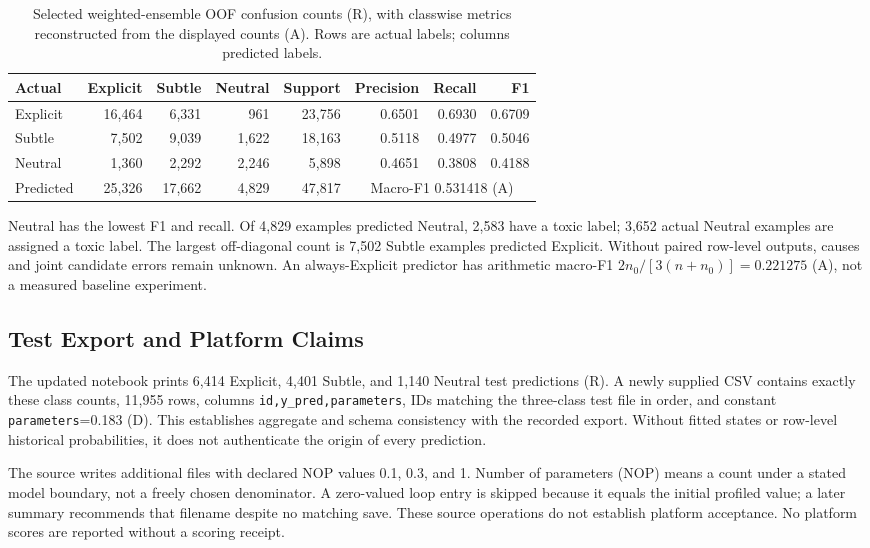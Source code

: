 \documentclass[doublecolumn]{ijcvsplatex}
\begin{document}
\begin{table}[t]
\small\centering
\caption{Selected weighted-ensemble OOF confusion counts (R), with classwise metrics reconstructed from the displayed counts (A). Rows are actual labels; columns predicted labels.}
\label{tab:confusion}
\begin{tabular}{lrrrrrrr}
\toprule
Actual & Explicit & Subtle & Neutral & Support & Precision & Recall & F1 \\
\midrule
Explicit & 16,464 & 6,331 & 961 & 23,756 & 0.6501 & 0.6930 & 0.6709 \\
Subtle & 7,502 & 9,039 & 1,622 & 18,163 & 0.5118 & 0.4977 & 0.5046 \\
Neutral & 1,360 & 2,292 & 2,246 & 5,898 & 0.4651 & 0.3808 & 0.4188 \\
\midrule
Predicted & 25,326 & 17,662 & 4,829 & 47,817 & \multicolumn{3}{c}{Macro-F1 0.531418 (A)} \\
\bottomrule
\end{tabular}
\end{table}

Neutral has the lowest F1 and recall. Of 4,829 examples predicted Neutral, 2,583 have a toxic label; 3,652 actual Neutral examples are assigned a toxic label. The largest off-diagonal count is 7,502 Subtle examples predicted Explicit. Without paired row-level outputs, causes and joint candidate errors remain unknown. An always-Explicit predictor has arithmetic macro-F1 $2n_0/[3(n+n_0)]=0.221275$ (A), not a measured baseline experiment.

\subsection{Test Export and Platform Claims}
The updated notebook prints 6,414 Explicit, 4,401 Subtle, and 1,140 Neutral test predictions (R). A newly supplied CSV contains exactly these class counts, 11,955 rows, columns \texttt{id,y\_pred,parameters}, IDs matching the three-class test file in order, and constant \texttt{parameters}=0.183 (D). This establishes aggregate and schema consistency with the recorded export. Without fitted states or row-level historical probabilities, it does not authenticate the origin of every prediction.

The source writes additional files with declared NOP values 0.1, 0.3, and 1. Number of parameters (NOP) means a count under a stated model boundary, not a freely chosen denominator. A zero-valued loop entry is skipped because it equals the initial profiled value; a later summary recommends that filename despite no matching save. These source operations do not establish platform acceptance. No platform scores are reported without a scoring receipt.
\end{document}
